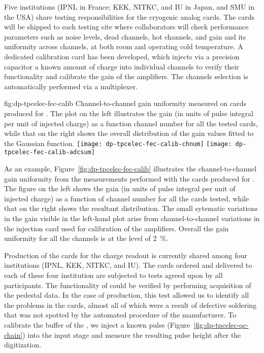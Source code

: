 Five institutions (IPNL in France; KEK, NITKC, and IU in Japan, and SMU in the USA) share testing responsibilities for the cryogenic  analog cards. The cards will be shipped to each testing site where collaborators will check performance parameters such as noise levels, dead channels, hot channels, and gain and its uniformity across channels, at both room and operating cold temperature. A dedicated calibration card has been developed, which injects via a precision capacitor a known amount of charge into individual  channels to verify their functionality and calibrate the gain of the amplifiers. The channels selection is automatically performed via a multiplexer.

\begin{dunefigure}{fig:dp-tpcelec-fec-calib}
{Channel-to-channel gain uniformity measured on  cards produced for . The plot on the left illustrates the gain (in units of pulse integral per unit of injected charge) as a function channel number for all the tested cards, while that on the right shows the overall distribution of the gain values fitted to the Gaussian function.}
\texttt{[image: dp-tpcelec-fec-calib-chnum]}
\texttt{[image: dp-tpcelec-fec-calib-adcsum]}
\end{dunefigure}

As an example, Figure~\ref{fig:dp-tpcelec-fec-calib} illustrates the channel-to-channel gain uniformity from the measurements performed with the  cards produced for . The figure on the left shows the gain (in units of pulse integral per unit of injected charge) as a function of channel number for all the cards tested, while that on the right shows the resultant distribution. The small sytematic variations in the gain visible in the left-hand plot  arise from channel-to-channel variations in the injection card used for calibration of the  amplifiers. Overall the gain uniformity for all the channels is at the level of \SI{2}{\percent}.

Production of the  cards for the charge readout is currently shared among four institutions (IPNL, KEK, NITKC, and IU). 
The cards ordered and delivered to each of these four institution are subjected to  tests agreed upon by all participants. 
The functionality of  could be verified by performing acquisition of the pedestal data. In the case of  production, this test allowed us to identify all the problems in the cards, almost all of which were a result of defective soldering that was not spotted by the automated  procedure of the manufacturer. To calibrate the  buffer of the  , we inject a known pulse (Figure~\ref{fig:dp-tpcelec-qc-chain}) into the input stage and measure the resulting pulse height after the digitization. 


